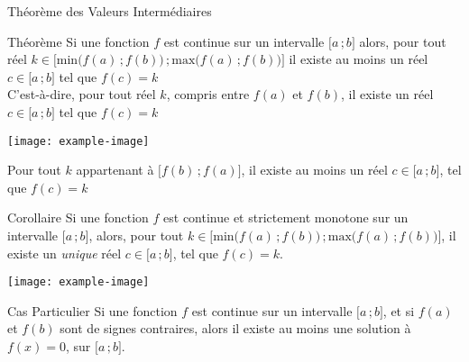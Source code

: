 \documentclass{cours}
\begin{document}
    \hspace{4ex}

    \begin{Gpartie}{Théorème des Valeurs Intermédiaires}
        \begin{Spartie}{Théorème}
            Si une fonction $f$ est continue sur un intervalle $\big[a\,;b\big]$ alors, pour tout réel $k\in\Big[\text{min}\big(f(a)\,;f(b)\big)\,;\text{max}\big(f(a)\,;f(b)\big)\Big]$ il existe au moins un réel $c\in\big[a\,;b\big]$ tel que $f(c)=k$ \\
            C'est-à-dire, pour tout réel $k$, compris entre $f(a)$ et $f(b)$, il existe un réel $c\in\big[a\,;b\big]$ tel que $f(c)=k$
            \begin{center}
                    \noindent\texttt{[image: example-image]}
                    \parbox{\linewidth}{}
            \end{center}
            Pour tout $k$ appartenant à $\big[f(b)\,;f(a)\big]$, il existe au moins un réel $c\in\big[a\,;b\big]$, tel que $f(c)=k$
        \end{Spartie}
        \begin{Spartie}{Corollaire}
            Si une fonction $f$ est continue et strictement monotone sur un intervalle $\big[a\,;b\big]$, alors, pour tout $k\in\Big[\text{min}\big(f(a)\,;f(b)\big)\,;\text{max}\big(f(a)\,;f(b)\big)\Big]$, il existe un \textit{unique} réel $c\in\big[a\,;b\big]$, tel que $f(c)=k$. 
            \begin{center}
                    \noindent\texttt{[image: example-image]}
                    \parbox{\linewidth}{}
            \end{center}
            \begin{SSpartie}{Cas Particulier}
                Si une fonction $f$ est continue sur un intervalle $\big[a\,;b\big]$, et si $f(a)$ et $f(b)$ sont de signes contraires, alors il existe au moins une solution à $f(x)=0$, sur $\big[a\,;b\big]$.
            \end{SSpartie}
        \end{Spartie}
    \end{Gpartie}
\end{document}
